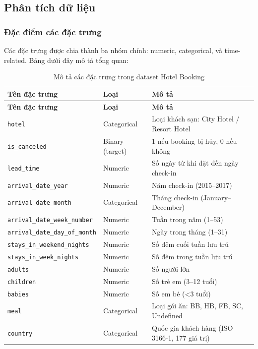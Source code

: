 \documentclass[12pt, a4paper]{article}
\begin{document}
\subsection{Phân tích dữ liệu}

\subsubsection{Đặc điểm các đặc trưng}

Các đặc trưng được chia thành ba nhóm chính: numeric, categorical, và time-related. Bảng dưới đây mô tả tổng quan:

\begin{longtable}{|l|l|p{7cm}|}
\caption{Mô tả các đặc trưng trong dataset Hotel Booking} \\
\hline
\textbf{Tên đặc trưng} & \textbf{Loại} & \textbf{Mô tả} \\ \hline
\endfirsthead
\hline
\textbf{Tên đặc trưng} & \textbf{Loại} & \textbf{Mô tả} \\ \hline
\endhead
\texttt{hotel} & Categorical & Loại khách sạn: City Hotel / Resort Hotel \\ \hline
\texttt{is\_canceled} & Binary (target) & 1 nếu booking bị hủy, 0 nếu không \\ \hline
\texttt{lead\_time} & Numeric & Số ngày từ khi đặt đến ngày check-in \\ \hline
\texttt{arrival\_date\_year} & Numeric & Năm check-in (2015--2017) \\ \hline
\texttt{arrival\_date\_month} & Categorical & Tháng check-in (January--December) \\ \hline
\texttt{arrival\_date\_week\_number} & Numeric & Tuần trong năm (1--53) \\ \hline
\texttt{arrival\_date\_day\_of\_month} & Numeric & Ngày trong tháng (1--31) \\ \hline
\texttt{stays\_in\_weekend\_nights} & Numeric & Số đêm cuối tuần lưu trú \\ \hline
\texttt{stays\_in\_week\_nights} & Numeric & Số đêm trong tuần lưu trú \\ \hline
\texttt{adults} & Numeric & Số người lớn \\ \hline
\texttt{children} & Numeric & Số trẻ em (3--12 tuổi) \\ \hline
\texttt{babies} & Numeric & Số em bé (<3 tuổi) \\ \hline
\texttt{meal} & Categorical & Loại gói ăn: BB, HB, FB, SC, Undefined \\ \hline
\texttt{country} & Categorical & Quốc gia khách hàng (ISO 3166-1, 177 giá trị) \\ \hline

\end{longtable}
\end{document}

